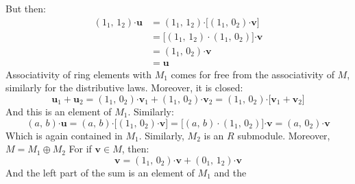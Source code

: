 \documentclass[crop=false,class=article]{standalone}                           %
\begin{document}
\begin{solution}
            But then:
            \begin{subequations}
                \begin{align}
                    (1_{1},\,1_{2})\boldsymbol{\cdot}\mathbf{u}
                    &=(1_{1},\,1_{2})\boldsymbol{\cdot}
                        \big[
                            (1_{1},\,0_{2})\boldsymbol{\cdot}\mathbf{v}
                        \big]\\
                    &=\big[(1_{1},\,1_{2})\cdot(1_{1},\,0_{2})\big]
                        \boldsymbol{\cdot}\mathbf{v}\\
                    &=(1_{1},\,0_{2})\boldsymbol{\cdot}\mathbf{v}\\
                    &=\mathbf{u}
                \end{align}
            \end{subequations}
            Associativity of ring elements with $M_{1}$ comes for free from
            the associativity of $M$, similarly for the distributive laws.
            Moreover, it is closed:
            \begin{equation}
                \mathbf{u}_{1}+\mathbf{u}_{2}=
                (1_{1},\,0_{2})\boldsymbol{\cdot}\mathbf{v}_{1}+
                (1_{1},\,0_{2})\boldsymbol{\cdot}\mathbf{v}_{2}
                =(1_{1},\,0_{2})\boldsymbol{\cdot}
                    \big[\mathbf{v}_{1}+\mathbf{v}_{2}\big]
            \end{equation}
            And this is an element of $M_{1}$. Similarly:
            \begin{equation}
                (a,\,b)\boldsymbol{\cdot}\mathbf{u}
                =(a,\,b)\boldsymbol{\cdot}
                    \big[
                        (1_{1},\,0_{2})\boldsymbol{\cdot}\mathbf{v}
                    \big]
                =\big[
                    (a,\,b)\cdot(1_{1},\,0_{2})
                \big]
                    \boldsymbol{\cdot}\mathbf{v}
                =(a,\,0_{2})\boldsymbol{\cdot}\mathbf{v}
            \end{equation}
            Which is again contained in $M_{1}$. Similarly, $M_{2}$ is an
            $R$ submodule. Moreover, $M=M_{1}\oplus{M}_{2}$ For if
            $\mathbf{v}\in{M}$, then:
            \begin{equation}
                \mathbf{v}=(1_{1},\,0_{2})\boldsymbol{\cdot}\mathbf{v}+
                           (0_{1},\,1_{2})\boldsymbol{\cdot}\mathbf{v}
            \end{equation}
            And the left part of the sum is an element of $M_{1}$ and the

\end{solution}
\end{document}
